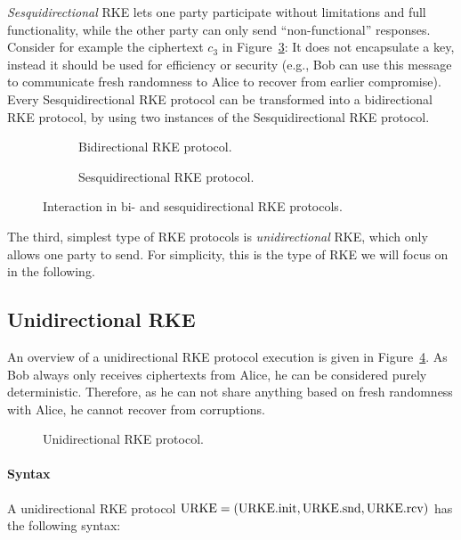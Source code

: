 \emph{Sesquidirectional} RKE lets one party participate without limitations  and full functionality, while the other party can only send ``non-functional'' responses.
Consider for example the ciphertext $c_3$ in Figure~\ref{fig:RKE:sesq}:
It does not encapsulate a key, instead it should be used for efficiency or security (e.g., Bob can use this message to communicate fresh randomness to Alice to recover from earlier compromise).
Every Sesquidirectional RKE protocol can be transformed into a bidirectional RKE protocol, by using two instances of the Sesquidirectional RKE protocol.

\begin{figure}[!ht]
    \centering
    \begin{subfigure}{.5\textwidth}
        \centering
        
        \caption{Bidirectional RKE protocol.}
        \label{fig:RKE:bi}
    \end{subfigure}\hfill
    \begin{subfigure}{.5\textwidth}
        \centering
        
        \caption{Sesquidirectional RKE protocol.}
        \label{fig:RKE:sesq}
    \end{subfigure}
    \caption{Interaction in bi- and sesquidirectional RKE protocols.}
\end{figure}

The third, simplest type of RKE protocols is \emph{unidirectional} RKE, which only allows one party to send.
For simplicity, this is the type of RKE we will focus on in the following.

\subsection{Unidirectional RKE}
An overview of a unidirectional RKE protocol execution is given in Figure~\ref{fig:rke:uni}.
As Bob always only receives ciphertexts from Alice, he can be considered purely deterministic.
Therefore, as he can not share anything based on fresh randomness with Alice, he cannot recover from corruptions.

\begin{figure}[!ht]
    \centering
    
    \caption{Unidirectional RKE protocol.}
    \label{fig:rke:uni}
\end{figure}

\paragraph{Syntax} A unidirectional RKE protocol $\mathrm{URKE}=(\mathrm{URKE}.\mathrm{init}, \mathrm{URKE}.\mathrm{snd}, \mathrm{URKE}.\mathrm{rcv})$ has the following syntax:

